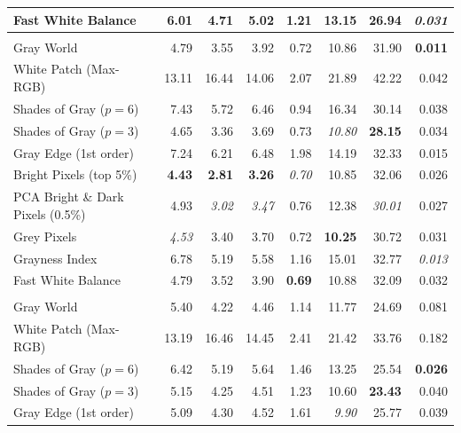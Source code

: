 \begin{longtable}{@{}>{\raggedright\arraybackslash}p{6.8cm}rrrrrrr@{}}
Fast White Balance~\cite{fast_wb_greyness} & 6.01 & 4.71 & 5.02 & 1.21 & 13.15 & 26.94 & \textit{0.031} \\
\midrule
\multicolumn{8}{@{}l}{\textbf{Cube++~\cite{ershov2020cube} ($N=4866$)}} \\
\midrule
Gray World~\cite{gray_world} & 4.79 & 3.55 & 3.92 & 0.72 & 10.86 & 31.90 & \textbf{0.011} \\
White Patch (Max-RGB)~\cite{white_patch} & 13.11 & 16.44 & 14.06 & 2.07 & 21.89 & 42.22 & 0.042 \\
Shades of Gray ($p=6$)~\cite{shades_of_gray} & 7.43 & 5.72 & 6.46 & 0.94 & 16.34 & 30.14 & 0.038 \\
Shades of Gray ($p=3$)~\cite{shades_of_gray} & 4.65 & 3.36 & 3.69 & 0.73 & \textit{10.80} & \textbf{28.15} & 0.034 \\
Gray Edge (1st order)~\cite{gray_edge} & 7.24 & 6.21 & 6.48 & 1.98 & 14.19 & 32.33 & 0.015 \\
Bright Pixels (top 5\%)~\cite{bright_pixels} & \textbf{4.43} & \textbf{2.81} & \textbf{3.26} & \textit{0.70} & 10.85 & 32.06 & 0.026 \\
PCA Bright \& Dark Pixels (0.5\%)~\cite{cheng2014illuminant} & 4.93 & \textit{3.02} & \textit{3.47} & 0.76 & 12.38 & \textit{30.01} & 0.027 \\
Grey Pixels~\cite{yangGrayPixels} & \textit{4.53} & 3.40 & 3.70 & 0.72 & \textbf{10.25} & 30.72 & 0.031 \\
Grayness Index~\cite{qianFindingGrayPixels} & 6.78 & 5.19 & 5.58 & 1.16 & 15.01 & 32.77 & \textit{0.013} \\
Fast White Balance~\cite{fast_wb_greyness} & 4.79 & 3.52 & 3.90 & \textbf{0.69} & 10.88 & 32.09 & 0.032 \\
\midrule
\multicolumn{8}{@{}l}{\textbf{NUS 8-Camera~\cite{cheng2014illuminant} ($N=1736$)}} \\
\midrule
Gray World~\cite{gray_world} & 5.40 & 4.22 & 4.46 & 1.14 & 11.77 & 24.69 & 0.081 \\
White Patch (Max-RGB)~\cite{white_patch} & 13.19 & 16.46 & 14.45 & 2.41 & 21.42 & 33.76 & 0.182 \\
Shades of Gray ($p=6$)~\cite{shades_of_gray} & 6.42 & 5.19 & 5.64 & 1.46 & 13.25 & 25.54 & \textbf{0.026} \\
Shades of Gray ($p=3$)~\cite{shades_of_gray} & 5.15 & 4.25 & 4.51 & 1.23 & 10.60 & \textbf{23.43} & 0.040 \\
Gray Edge (1st order)~\cite{gray_edge} & 5.09 & 4.30 & 4.52 & 1.61 & \textit{9.90} & 25.77 & 0.039 \\

\end{longtable}
